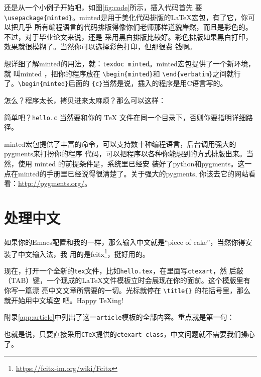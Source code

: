 还是从一个小例子开始吧，如图\ref{fig:code}所示，插入代码首先
要\verb'\usepackage{minted}'。minted是用于美化代码排版的\LaTeX{}宏包，有了它，你可以把几乎
所有编程语言的代码排版得像你们老师那样道貌岸然，而且是彩色的。不过，对于毕业论文来说，还是
采用黑白排版比较好。彩色排版如果黑白打印，效果就很模糊了。当然你可以选择彩色打印，但那很费
钱啊。

想详细了解minted的用法，就：\texttt{texdoc minted}。minted宏包提供了一个新环境，就
叫minted ，把你的程序放在 \verb'\begin{minted}'和 \verb'\end{verbatim}'之间就行
了。\verb'\begin{minted}'后面的 \verb'{c}'当然是说，插入的程序是用C语言写的。
  
怎么？程序太长，拷贝进来太麻烦？那么可以这样：

\begin{codeblock}[.9]
\end{codeblock}

简单吧？\texttt{hello.c} 当然要和你的 \TeX{} 文件在同一个目录下，否则你要指明详细路径。

minted宏包提供了丰富的命令，可以支持数十种编程语言，后台调用强大的pygments来打扮你的程序
代码，可以把程序以各种你能想到的方式排版出来。当然，使用 minted 的前提条件是，系统里已经安
装好了python和pygments。这一点在minted的手册里已经说得很清楚了。关于强大的pygments,
你该去它的网站看看：\url{http://pygments.org/}。

\section{处理中文}
\label{sec:cn}

如果你的Emacs配置和我的一样，那么输入中文就是“piece of cake”，当然你得安装了中文输入法，我
用的是fcitx\footnote{\url{https://fcitx-im.org/wiki/Fcitx}}，挺好用的。

现在，打开一个全新的\texttt{tex}文件，比如\texttt{hello.tex}，在里面写\texttt{ctexart}，然
后敲{\Tab}（TAB）键，一个现成的\LaTeX{}文件模板立时会展现在你的面前。这个模版里有你写一篇漂
亮中文文章所需要的一切。光标就停在 \verb'\title{}' 的花括号里，那么就开始用中文填空
吧。Happy \TeX{}ing!

附录\ref{app:article}中列出了这一\texttt{article}模板的全部内容。重点就是第一句：


也就是说，只要直接采用\texttt{CTeX}提供的\texttt{ctexart class}，中文问题就不需要我们操心
了。



